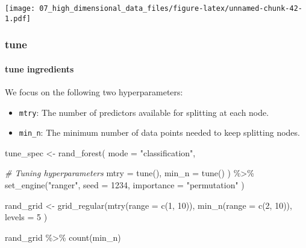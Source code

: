 \documentclass[
]{book}
\newenvironment{Shaded}{\begin{snugshade}}{\end{snugshade}}
\newcommand{\AttributeTok}[1]{\textcolor[rgb]{0.77,0.63,0.00}{#1}}
\newcommand{\CommentTok}[1]{\textcolor[rgb]{0.56,0.35,0.01}{\textit{#1}}}
\newcommand{\DecValTok}[1]{\textcolor[rgb]{0.00,0.00,0.81}{#1}}
\newcommand{\FunctionTok}[1]{\textcolor[rgb]{0.00,0.00,0.00}{#1}}
\newcommand{\NormalTok}[1]{#1}
\newcommand{\OtherTok}[1]{\textcolor[rgb]{0.56,0.35,0.01}{#1}}
\newcommand{\SpecialCharTok}[1]{\textcolor[rgb]{0.00,0.00,0.00}{#1}}
\newcommand{\StringTok}[1]{\textcolor[rgb]{0.31,0.60,0.02}{#1}}
\begin{document}
\texttt{[image: 07\_high\_dimensional\_data\_files/figure-latex/unnamed-chunk-42-1.pdf]}

\hypertarget{tune-2}{%
\subsubsection{tune}\label{tune-2}}

\hypertarget{tune-ingredients-2}{%
\paragraph{tune ingredients}\label{tune-ingredients-2}}

We focus on the following two hyperparameters:

\begin{itemize}
\item
  \texttt{mtry}: The number of predictors available for splitting at each node.
\item
  \texttt{min\_n}: The minimum number of data points needed to keep splitting nodes.
\end{itemize}

\begin{Shaded}
\begin{Highlighting}[]
\NormalTok{tune\_spec }\OtherTok{\textless{}{-}}
  \FunctionTok{rand\_forest}\NormalTok{(}
    \AttributeTok{mode =} \StringTok{"classification"}\NormalTok{,}

    \CommentTok{\# Tuning hyperparameters}
    \AttributeTok{mtry =} \FunctionTok{tune}\NormalTok{(),}
    \AttributeTok{min\_n =} \FunctionTok{tune}\NormalTok{()}
\NormalTok{  ) }\SpecialCharTok{\%\textgreater{}\%}
  \FunctionTok{set\_engine}\NormalTok{(}\StringTok{"ranger"}\NormalTok{,}
    \AttributeTok{seed =} \DecValTok{1234}\NormalTok{,}
    \AttributeTok{importance =} \StringTok{"permutation"}
\NormalTok{  )}

\NormalTok{rand\_grid }\OtherTok{\textless{}{-}} \FunctionTok{grid\_regular}\NormalTok{(}\FunctionTok{mtry}\NormalTok{(}\AttributeTok{range =} \FunctionTok{c}\NormalTok{(}\DecValTok{1}\NormalTok{, }\DecValTok{10}\NormalTok{)),}
  \FunctionTok{min\_n}\NormalTok{(}\AttributeTok{range =} \FunctionTok{c}\NormalTok{(}\DecValTok{2}\NormalTok{, }\DecValTok{10}\NormalTok{)),}
  \AttributeTok{levels =} \DecValTok{5}
\NormalTok{)}

\NormalTok{rand\_grid }\SpecialCharTok{\%\textgreater{}\%}
  \FunctionTok{count}\NormalTok{(min\_n)}
\end{Highlighting}
\end{Shaded}
\end{document}
